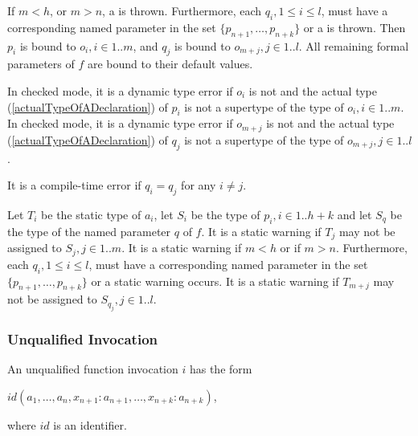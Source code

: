 \documentclass{article}
\begin{document}


\LMHash{}
If  $m < h$, or $m > n$, a  is thrown. Furthermore, each $q_i, 1 \le i \le l$,  must have a corresponding named parameter in the set $\{p_{n+1}, \ldots, p_{n +k}\}$ or a  is thrown. Then $p_i$ is bound to $o_i, i \in 1.. m$, and $q_j$  is bound to $o_{m+j}, j \in 1.. l$.  All remaining formal parameters of $f$  are bound to their default values.


\LMHash{}
In checked mode, it is a dynamic type error if  $o_i$ is not \NULL{} and the actual type  (\ref{actualTypeOfADeclaration}) of $p_i$ is not a supertype of the type of $o_i, i \in 1.. m$. In checked mode, it is a dynamic type error if  $o_{m+j}$ is not \NULL{} and the actual type  (\ref{actualTypeOfADeclaration}) of $q_j$ is not a supertype of the type of $o_{m+j}, j \in 1.. l$.

\LMHash{}
It is a compile-time error if $q_i = q_j$ for any $i \ne j$.

\LMHash{}
Let $T_i$ be the static type of $a_i$, let $S_i$ be the type of $p_i, i \in 1 .. h+k$ and let $S_q$ be the type of the named parameter $q$ of $f$.  It is a static warning if $T_j$ may not be assigned to $S_j, j \in 1..m$.  It is a static warning if $m < h$ or if $m > n$. Furthermore, each $q_i, 1 \le i \le l$,  must have a corresponding named parameter in the set $\{p_{n+1}, \ldots, p_{n +k}\}$ or a static warning occurs.  It is a static warning if $T_{m+j}$ may not be assigned to $S_{q_j}, j \in 1 .. l$.

\subsubsection{ Unqualified Invocation}

\LMHash{}
An unqualified function invocation $i$ has the form

$id(a_1, \ldots, a_n, x_{n+1}: a_{n+1}, \ldots, x_{n+k}: a_{n+k})$,

where $id$ is an identifier.
\end{document}
